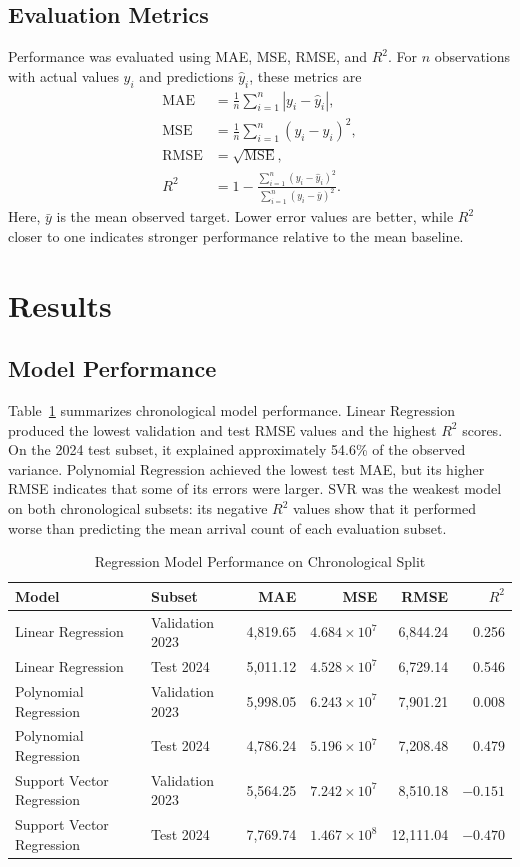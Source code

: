 \documentclass[conference,a4paper]{IEEEtran}
\begin{document}
\subsection{Evaluation Metrics}
Performance was evaluated using MAE, MSE, RMSE, and $R^2$. For $n$ observations with actual values $y_i$ and predictions $\hat{y}_i$, these metrics are
\begin{align}
    \mathrm{MAE} &= \frac{1}{n}\sum_{i=1}^{n}|y_i-\hat{y}_i|,\\
    \mathrm{MSE} &= \frac{1}{n}\sum_{i=1}^{n}(y_i-\hat{y}_i)^2,\\
    \mathrm{RMSE} &= \sqrt{\mathrm{MSE}},\\
    R^2 &= 1-\frac{\sum_{i=1}^{n}(y_i-\hat{y}_i)^2}
    {\sum_{i=1}^{n}(y_i-\bar{y})^2}.
\end{align}
Here, $\bar{y}$ is the mean observed target. Lower error values are better, while $R^2$ closer to one indicates stronger performance relative to the mean baseline.

\section{Results}

\subsection{Model Performance}
Table~\ref{tab:model-performance} summarizes chronological model performance. Linear Regression produced the lowest validation and test RMSE values and the highest $R^2$ scores. On the 2024 test subset, it explained approximately 54.6\% of the observed variance. Polynomial Regression achieved the lowest test MAE, but its higher RMSE indicates that some of its errors were larger. SVR was the weakest model on both chronological subsets: its negative $R^2$ values show that it performed worse than predicting the mean arrival count of each evaluation subset.

\begin{table}[htbp]
\caption{Regression Model Performance on Chronological Split}
\label{tab:model-performance}
\centering
\begin{tabular}{llrrrr}
\toprule
\textbf{Model} & \textbf{Subset} & \textbf{MAE} & \textbf{MSE} & \textbf{RMSE} & \textbf{$R^2$} \\
\midrule
Linear Regression & Validation 2023 & 4,819.65 & $4.684\times10^7$ & 6,844.24 & 0.256 \\
Linear Regression & Test 2024 & 5,011.12 & $4.528\times10^7$ & 6,729.14 & 0.546 \\
Polynomial Regression & Validation 2023 & 5,998.05 & $6.243\times10^7$ & 7,901.21 & 0.008 \\
Polynomial Regression & Test 2024 & 4,786.24 & $5.196\times10^7$ & 7,208.48 & 0.479 \\
Support Vector Regression & Validation 2023 & 5,564.25 & $7.242\times10^7$ & 8,510.18 & $-0.151$ \\
Support Vector Regression & Test 2024 & 7,769.74 & $1.467\times10^8$ & 12,111.04 & $-0.470$ \\
\bottomrule
\end{tabular}
\end{table}
\end{document}
